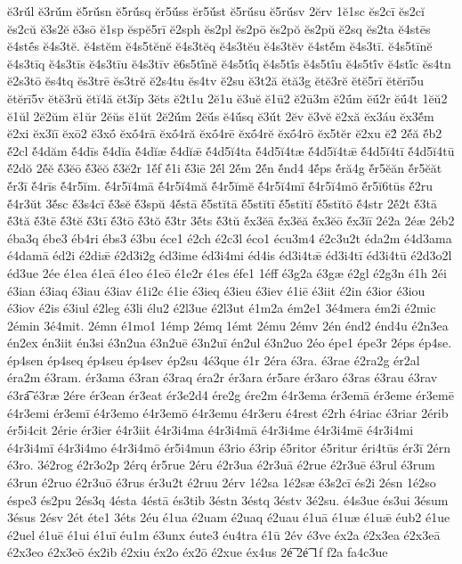 {ĕ3rŭ́l
ĕ3rŭ́m
ĕ5rŭ́sn
ĕ5rŭ́sq
ĕr5ŭ́ss
ĕr5ŭ́st
ĕ5rŭ́su
ĕ5rŭ́sv
2ĕrv
1ĕ1sc
ĕs2cī
ĕs2cĭ
ĕs2cŭ
ĕ3s2ĕ
ĕ3sō
ĕ1sp
ĕspĕ5rī
ĕ2sph
ĕs2pl
ĕs2pō
ĕs2pŏ
ĕs2pŭ
ĕ2sq
ĕs2ta
ĕ4stēs
ĕ4stḗs
ĕ4s3tĕ.
ĕ4stĕm
ĕ4s5tĕnĕ
ĕ4s3tĕq
ĕ4s3tĕu
ĕ4s3tĕv
ĕ4stĕ́m
ĕ4s3tī.
ĕ4s5tīnĕ
ĕ4s3tīq
ĕ4s3tīs
ĕ4s3tīu
ĕ4s3tīv
ĕ6s5tī́nĕ
ĕ4s5tī́q
ĕ4s5tī́s
ĕ4s5tī́u
ĕ4s5tī́v
ĕ4stĭ́c
ĕs4tn
ĕ2s3tō
ĕs4tq
ĕs3trē
ĕs3trĕ
ĕ2s4tu
ĕs4tv
ĕ2su
ĕ3t2ă
ĕtă3g
ĕtĕ3rĕ
ĕtĕ5rī
ĕtĕrī5u
ĕtĕrī5v
ĕtĕ3rŭ
ĕtĭ4ă
ĕt3ĭp
3ĕts
ĕ2t1u
2ĕ1u
ĕ3uĕ
ĕ1ū2
ĕ2ū3m
ĕ2ū́m
ĕū́2r
ĕū́4t
1ĕŭ2
ĕ1ŭl
2ĕ2ŭm
ĕ1ŭr
2ĕŭs
ĕ1ŭt
2ĕ2ŭ́m
2ĕŭ́s
ĕ4ŭ́sq
ĕ3ŭ́t
2ĕv
ĕ3vĕ
ĕ2xă
ĕx3áu
ĕx3ĕ́m
ĕ2xi
ĕx3ĭī
ĕxō2
ĕ3xṓ
ĕxṓ4rā
ĕxṓ4ră
ĕxṓ4rē
ĕxṓ4rĕ
ĕxṓ4rō
ĕx5tĕr
ĕ2xu
ĕ2́
2ĕ́ă
ĕ́b2
ĕ́2cl
ĕ́4dăm
ĕ́4dīs
ĕ́4dĭa
ĕ́4dĭæ
ĕ́4dĭǣ
ĕ́4d5ĭ4ta
ĕ́4d5ĭ4tæ
ĕ́4d5ĭ4tǣ
ĕ́4d5ĭ4tī
ĕ́4d5ĭ4tū
ĕ́2dŏ
2ĕ́ĕ
ĕ́3ĕō
ĕ́3ĕŏ
ĕ́3ĕ2r
1ĕ́f
ĕ́1i
ĕ́3iē
2ĕ́l
2ĕ́m
2ĕ́n
ĕ́nd4
4ĕ́ps
ĕ́ră4g
ĕ́r5ĕăn
ĕ́r5ĕăt
ĕ́r3ī
ĕ́4rīs
ĕ́4r5ĭm.
ĕ́4r5ĭ4mā
ĕ́4r5ĭ4mă
ĕ́4r5ĭmĕ
ĕ́4r5ĭ4mī
ĕ́4r5ĭ4mō
ĕ́r5ĭ6tūs
ĕ́2ru
ĕ́4r3ŭt
3ĕ́sc
ĕ́3s4cī
ĕ́3sĕ
ĕ́3spŭ
4ĕ́stā
ĕ́5stĭtā
ĕ́5stĭtī
ĕ́5stĭtĭ
ĕ́5stĭtō
ĕ́4str
2ĕ́2t
ĕ́3tā
ĕ́3tă
ĕ́3tē
ĕ́3tĕ
ĕ́3tī
ĕ́3tō
ĕ́3tŏ
ĕ́3tr
3ĕ́ts
ĕ́3tŭ
ĕ́x3ĕā
ĕ́x3ĕă
ĕ́x3ĕō
ĕ́x3ĭī
2é2a
2éæ
2éb2
éba3q
ébe3
éb4ri
ébs3
é3bu
éce1
é2ch
é2c3l
éco1
écu3m4
é2c3u2t
éda2m
é4d3ama
é4damā
éd2i
é2diǣ
é2d3i2g
éd3ime
éd3i4mi
éd4is
éd3i4tǣ
éd3i4tī
éd3i4tū
é2d3o2l
éd3ue
2ée
é1ea
é1eā
é1eo
é1eō
é1e2r
é1es
éfe1
1éff
é3g2a
é3gæ
é2gl
é2g3n
é1h
2éi
é3ian
é3iaq
é3iau
é3iav
é1i2c
é1ie
é3ieq
é3ieu
é3iev
é1iē
é3iit
é2in
é3ior
é3iou
é3iov
é2is
é3iul
é2leg
é3li
élu2
é2l3ue
é2l3ut
é1m2a
ém2e1
3é4mera
ém2i
é2mic
2émin
3é4mit.
2émn
é1mo1
1émp
2émq
1émt
2ému
2émv
2én
énd2
énd4u
é2n3ea
én2ex
én3iit
én3si
é3n2ua
é3n2uē
é3n2uī
én2ul
é3n2uo
2éo
épe1
épe3r
2éps
ép4se.
ép4sen
ép4seq
ép4seu
ép4sev
ép2su
4é3que
é1r
2éra
é3ra.
é3rae
é2ra2g
ér2al
éra2m
é3ram.
ér3ama
é3ran
é3raq
éra2r
ér3ara
ér5are
ér3aro
é3ras
é3rau
é3rav
é3ra͡
é3ræ
2ére
ér3ean
ér3eat
ér3e2d4
ére2g
ére2m
é4r3ema
ér3emā
ér3eme
ér3emē
é4r3emi
ér3emī
é4r3emo
é4r3emō
é4r3emu
é4r3eru
é4rest
é2rh
é4riac
é3riar
2érib
ér5i4cit
2érie
ér3ier
é4r3iit
é4r3i4ma
é4r3i4mā
é4r3i4me
é4r3i4mē
é4r3i4mi
é4r3i4mī
é4r3i4mo
é4r3i4mō
ér5i4mun
é3rio
é3rip
é5ritor
é5ritur
éri4tūs
ér3ī
2érn
é3ro.
3é2rog
é2r3o2p
2érq
ér5rue
2éru
é2r3ua
é2r3uā
é2rue
é2r3uē
é3rul
é3rum
é3run
é2ruo
é2r3uō
é3rus
ér3u2t
é2ruu
2érv
1é2sa
1é2sæ
é3s2cī
és2i
2ésn
1é2so
éspe3
és2pu
2és3q
4ésta
4éstā
és3tib
3éstn
3éstq
3éstv
3é2su.
é4s3ue
és3ui
3ésum
3ésus
2ésv
2ét
éte1
3éts
2éu
é1ua
é2uam
é2uaq
é2uau
é1uā
é1uæ
é1uǣ
éub2
é1ue
é2uel
é1uē
é1ui
é1uī
éu1m
é3unx
éute3
éu4tra
é1ū
2év
é3ve
éx2a
é2x3ea
é2x3eā
é2x3eo
é2x3eō
éx2ib
é2xiu
éx2o
éx2ō
é2xue
éx4us
2é͞
2é͡
1f
f2a
fa4c3ue
}
